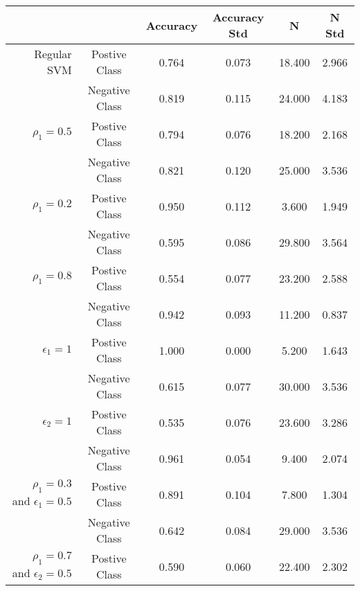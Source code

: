\begin{table}[htp]
\begin{tabular}{rc|cccc}
\hline
           &            & Accuracy  & Accuracy Std &          N &      N Std \\
\hline
\hline
Regular SVM & Postive Class &      0.764 &      0.073 &     18.400 &      2.966 \\

           & Negative Class &      0.819 &      0.115 &     24.000 &      4.183 \\
\hline
    $\rho_1=0.5$ & Postive Class &      0.794 &      0.076 &     18.200 &      2.168 \\

           & Negative Class &      0.821 &      0.120 &     25.000 &      3.536 \\
\hline
    $\rho_1=0.2$ & Postive Class &      0.950 &      0.112 &      3.600 &      1.949 \\

           & Negative Class &      0.595 &      0.086 &     29.800 &      3.564 \\
\hline
    $\rho_1=0.8$ & Postive Class &      0.554 &      0.077 &     23.200 &      2.588 \\

           & Negative Class &      0.942 &      0.093 &     11.200 &      0.837 \\
\hline
      $\epsilon_1=1$ & Postive Class &      1.000 &      0.000 &      5.200 &      1.643 \\

           & Negative Class &      0.615 &      0.077 &     30.000 &      3.536 \\
\hline
      $\epsilon_2=1$ & Postive Class &      0.535 &      0.076 &     23.600 &      3.286 \\

           & Negative Class &      0.961 &      0.054 &      9.400 &      2.074 \\
\hline
$\rho_1=0.3$ and $\epsilon_1=0.5$ & Postive Class &      0.891 &      0.104 &      7.800 &      1.304 \\

           & Negative Class &      0.642 &      0.084 &     29.000 &      3.536 \\
\hline
$\rho_1=0.7$ and $\epsilon_2=0.5$ & Postive Class &      0.590 &      0.060 &     22.400 &      2.302 \\


\end{tabular}
\end{table}
